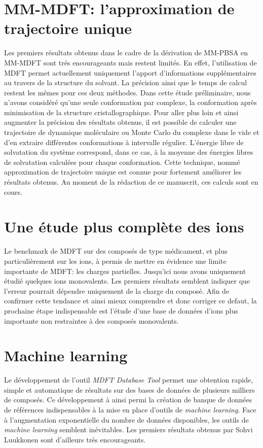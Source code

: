 \section{MM-MDFT: l'approximation de trajectoire unique }
Les premiers résultats obtenus dans le cadre de la dérivation de MM-PBSA en MM-MDFT sont trés encourageants mais restent limités. En effet, l'utilisation de MDFT permet actuellement uniquement l'apport d'informations supplémentaires au travers de la structure du solvant. La précision ainsi que le temps de calcul restent les mêmes pour ces deux méthodes. Dans cette étude préliminaire, nous n'avons considéré qu'une seule conformation par complexe, la conformation après minimisation de la structure cristallographique. Pour aller plus loin et ainsi augmenter la précision des résultats obtenus, il est possible de calculer une trajectoire de dynamique moléculaire ou Monte Carlo du complexe dans le vide et d'en extraire différentes conformations à intervalle régulier. L'énergie libre de solvatation du système correspond, dans ce cas, à la moyenne des énergies libres de solvatation calculées pour chaque conformation. Cette technique, nommé approximation de trajectoire unique est connue pour fortement améliorer les résultats obtenus. Au moment de la rédaction de ce manuscrit, ces calculs sont en cours.

\section{Une étude plus complète des ions}
Le benchmark de MDFT sur des composés de type médicament, et plus particulièrement sur les ions, à permis de mettre en évidence une limite importante de MDFT: les charges partielles. Jusqu'ici nous avons uniquement étudié quelques ions monovalents. Les premiers résultats semblent indiquer que l'erreur pourrait dépendre uniquement de la charge du composé. Afin de confirmer cette tendance et ainsi mieux comprendre et donc corriger ce defaut, la prochaine étape indispensable est l'étude d'une base de données d'ions plus importante non restraintes à des composés monovalents.

\section{Machine learning}
Le développement de l'outil \textit{MDFT Database Tool} permet une obtention rapide, simple et automatique de résultats sur des bases de données de plusieurs milliers de composés. Ce développement à ainsi permi la création de banque de données de références indispensables à la mise en place d'outils de \textit{machine learning}. Face à l'augmentation exponentielle du nombre de données disponibles, les outils de \textit{machine learning} semblent inévitables. Les premiers résultats obtenus par Sohvi Luukkonen sont d'ailleurs trés encourageants.

